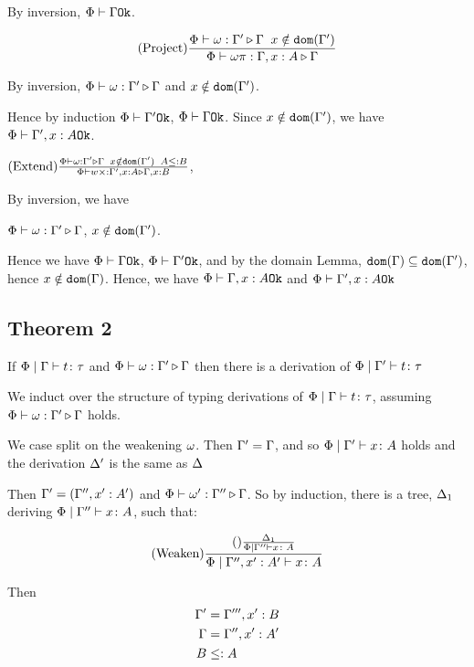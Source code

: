 {    By inversion, $\Phi\vdash \Gamma \texttt{Ok}$.

    $$(\text{Project}) \frac{\Phi\vdash \omega : \Gamma' \triangleright \Gamma\;\; x \notin \texttt{dom}(\Gamma')}{\Phi\vdash \omega \pi : \Gamma, x: A \triangleright \Gamma}$$

    By inversion, $\Phi\vdash \omega : \Gamma' \triangleright \Gamma$ and $x\notin \texttt{dom}(\Gamma')$.

    Hence by induction $\Phi\vdash \Gamma' \texttt{Ok}$, $\Phi\vdash \Gamma \texttt{Ok}$. Since $x\notin\texttt{dom}(\Gamma')$, we have $\Phi\vdash \Gamma', x:A \texttt{Ok}$.

    $(\text{Extend}) \frac{\Phi\vdash \omega : \Gamma' \triangleright \Gamma\;\; x \notin \texttt{dom}(\Gamma')\;\; A \leq: B}{\Phi\vdash w \times : \Gamma', x: A \triangleright \Gamma, x: B}$, 

    By inversion, we have 

    $\Phi\vdash \omega : \Gamma' \triangleright \Gamma$, $x\notin\texttt{dom}(\Gamma')$.

    Hence we have $\Phi\vdash \Gamma \texttt{Ok}$, $\Phi\vdash \Gamma' \texttt{Ok}$, and by the domain Lemma, $\texttt{dom}(\Gamma)\subseteq\texttt{dom}(\Gamma')$, hence $x\notin\texttt{dom}(\Gamma)$. Hence, we have $\Phi\vdash \Gamma, x: A \texttt{Ok}$ and $\Phi\vdash \Gamma',x:A \texttt{Ok}$


    \subsection{Theorem 2}
    If $\Phi\mid\Gamma \vdash t \colon \tau$ and $\Phi\vdash \omega : \Gamma' \triangleright \Gamma$ then there is a derivation of $\Phi\mid\Gamma' \vdash t \colon \tau$

    \proof

    We induct over the structure of typing derivations of $\Phi\mid\Gamma \vdash t \colon \tau$, assuming $\Phi\vdash \omega : \Gamma' \triangleright \Gamma$ holds.

        We case split on the weakening $\omega$.
        \subcase{$\w = \i$}
        Then $\Gamma' = \Gamma$, and so $\Phi\mid\Gamma' \vdash x \colon A$ holds and the derivation $\Delta'$ is the same as $\Delta$


        Then  $\Gamma' = (\Gamma'',x': A')$ and $\Phi\vdash \omega' : \Gamma'' \triangleright \Gamma$. So by induction, there is a tree, $\Delta_1$ deriving $\Phi\mid\Gamma'' \vdash x \colon A$,  such that:
        
        \begin{equation}
            (\text{Weaken}) \frac{(\text{}) \frac{\Delta_1}{\Phi\mid\Gamma'' \vdash x \colon A}}{\Phi\mid\Gamma'', x':A'  \vdash x \colon A}
        \end{equation}

        Then 
        \begin{align}
            \Gamma' & = \Gamma''', x': B\\
            \Gamma &= \Gamma'', x': A'\\
            B & \leq: A
        \end{align}

}
